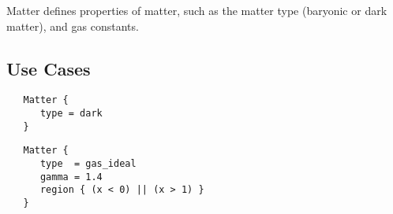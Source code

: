  Matter defines properties of matter, such as the matter type (baryonic
 or dark matter), and gas constants.

\subsection{Use Cases}

\begin{verbatim}
   Matter {
      type = dark
   }
\end{verbatim}

\begin{verbatim}
   Matter {
      type  = gas_ideal
      gamma = 1.4
      region { (x < 0) || (x > 1) }
   }
\end{verbatim}
